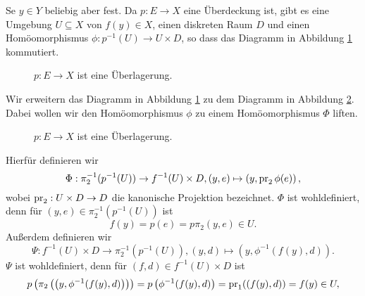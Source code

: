 \documentclass[a4paper,10pt]{article}
\begin{document}
Se $y \in Y$ beliebig aber fest. Da $p : E \to X$ eine Überdeckung ist, gibt es eine Umgebung $U \subseteq X$ von $f(y) \in X$, einen diskreten Raum $D$ und einen Homöomorphismus $\phi : p^{-1}(U) \to U \times D$, so dass das Diagramm in Abbildung \ref{fig: unterer Teil} kommutiert.
\begin{figure}[h]\centering
 \caption{$p : E \to X$ ist eine Überlagerung.}
 \label{fig: unterer Teil}
\end{figure}

Wir erweitern das Diagramm in Abbildung \ref{fig: unterer Teil} zu dem Diagramm in Abbildung \ref{fig: gesammtes Diagramm}. Dabei wollen wir den Homöomorphismus $\phi$ zu einem Homöomorphismus $\Phi$ liften.
\begin{figure}[h]\centering
 \caption{$p : E \to X$ ist eine Überlagerung.}
 \label{fig: gesammtes Diagramm}
\end{figure}

Hierfür definieren wir
\[
 \Phi : \pi_2^{-1}(p^{-1}(U)) \to f^{-1}(U) \times D, (y,e) \mapsto \left( y, \operatorname{pr}_2 \phi(e) \right),
\]
wobei $\operatorname{pr}_2 : U \times D \to D$ die kanonische Projektion bezeichnet. $\Phi$ ist wohldefiniert, denn für $(y,e) \in \pi_2^{-1}(p^{-1}(U))$ ist
\[
 f(y) = p(e) = p \pi_2(y,e) \in U.
\]
Außerdem definieren wir
\[
 \Psi : f^{-1}(U) \times D \to \pi_2^{-1}(p^{-1}(U)), (y,d) \mapsto \left( y, \phi^{-1}(f(y),d) \right).
\]
$\Psi$ ist wohldefiniert, denn für $(f,d) \in f^{-1}(U) \times D$ ist
\[
 p\left(\pi_2\left( \left( y, \phi^{-1}(f(y),d) \right) \right)\right)
 = p\left( \phi^{-1}(f(y),d) \right)
 = \operatorname{pr}_1((f(y),d))
 = f(y)
 \in U,
\]
\end{document}
